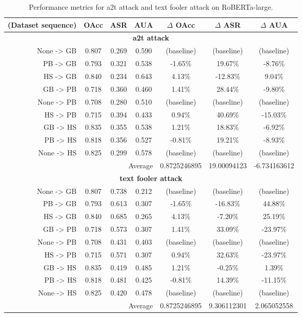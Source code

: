 \documentclass{article}
\begin{document}
\begin{table}[ht]
\centering
\caption{Performance metrics for a2t attack and text fooler attack on RoBERTa-large.}
\small
\begin{tabular}{r|ccc|ccc}
\hline
\textbf{(Dataset sequence)} & \textbf{OAcc} & \textbf{ASR} & \textbf{AUA} & \textbf{$\Delta$ OAcc} & \textbf{$\Delta$ ASR} & \textbf{$\Delta$ AUA} \\ \hline
\multicolumn{7}{c}{\textbf{a2t attack}} \\ \hline
None -> GB & 0.807 & 0.269 & 0.590 & (baseline) & (baseline) & (baseline) \\
PB -> GB & 0.793 & 0.321 & 0.538 & -1.65\% & 19.67\% & -8.76\% \\
HS -> GB & 0.840 & 0.234 & 0.643 & 4.13\% & -12.83\% & 9.04\% \\
GB -> PB & 0.718 & 0.360 & 0.460 & 1.41\% & 28.44\% & -9.80\% \\
None -> PB & 0.708 & 0.280 & 0.510 & (baseline) & (baseline) & (baseline) \\
HS -> PB & 0.715 & 0.394 & 0.433 & 0.94\% & 40.69\% & -15.03\% \\
GB -> HS & 0.835 & 0.355 & 0.538 & 1.21\% & 18.83\% & -6.92\% \\
PB -> HS & 0.818 & 0.356 & 0.527 & -0.81\% & 19.21\% & -8.93\% \\
None -> HS & 0.825 & 0.299 & 0.578 & (baseline) & (baseline) & (baseline) \\ \hline
\multicolumn{4}{r|}{Average} & 0.8725246895 & 19.00094123 & -6.734163612 \\ \hline
\multicolumn{7}{c}{\textbf{text fooler attack}} \\ \hline
None -> GB & 0.807 & 0.738 & 0.212 & (baseline) & (baseline) & (baseline) \\
PB -> GB & 0.793 & 0.613 & 0.307 & -1.65\% & -16.83\% & 44.88\% \\
HS -> GB & 0.840 & 0.685 & 0.265 & 4.13\% & -7.20\% & 25.19\% \\
GB -> PB & 0.718 & 0.573 & 0.307 & 1.41\% & 33.09\% & -23.97\% \\
None -> PB & 0.708 & 0.431 & 0.403 & (baseline) & (baseline) & (baseline) \\
HS -> PB & 0.715 & 0.571 & 0.307 & 0.94\% & 32.63\% & -23.97\% \\
GB -> HS & 0.835 & 0.419 & 0.485 & 1.21\% & -0.25\% & 1.39\% \\
PB -> HS & 0.818 & 0.481 & 0.425 & -0.81\% & 14.39\% & -11.15\% \\
None -> HS & 0.825 & 0.420 & 0.478 & (baseline) & (baseline) & (baseline) \\ \hline
\multicolumn{4}{r|}{Average} & 0.8725246895 & 9.306112301 & 2.065052558 \\ \hline
\end{tabular}
\label{table:roberta_large_attack_comparison}
\end{table}
\end{document}
